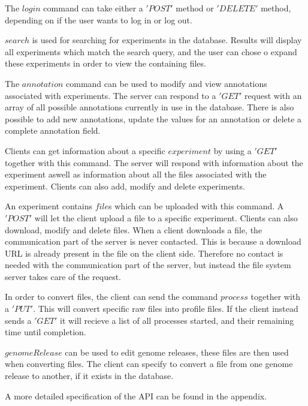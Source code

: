 The $login$ command can take either a $'POST'$ method or $'DELETE'$ method, depending on if the user wants to log in or log out.

$search$ is used for searching for experiments in the database. Results will display all experiments which match the search query, and the user can chose o expand these experiments in order to view the containing files.

The $annotation$ command can be used to modify and view annotations associated with experiments. The server can respond to a $'GET'$ request with an array of all possible annotations currently in use in the database. There is also possible to add new annotations, update the values for an annotation or delete a complete annotation field.

Clients can get information about a specific $experiment$ by using a $'GET'$ together with this command. The server will respond with information about the experiment aswell as information about all the files associated with the experiment. Clients can also add, modify and delete experiments.

An experiment contains $file$s which can be uploaded with this command. A $'POST'$ will let the client upload a file to a specific experiment. Clients can also download, modify and delete files. When a client downloads a file, the communication part of the server is never contacted. This is because a download URL is already present in the file on the client side. Therefore no contact is needed with the communication part of the server, but instead the file system server takes care of the request.

In order to convert files, the client can send the command $process$ together with a $'PUT'$. This will convert specific raw files into profile files. If the client instead sends a $'GET'$ it will recieve a list of all processes started, and their remaining time until completion.

$genomeRelease$ can be used to edit genome releases, these files are then used when converting files. The client can specify to convert a file from one genome release to another, if it exists in the database.

A more detailed specification of the API can be found in the appendix.
